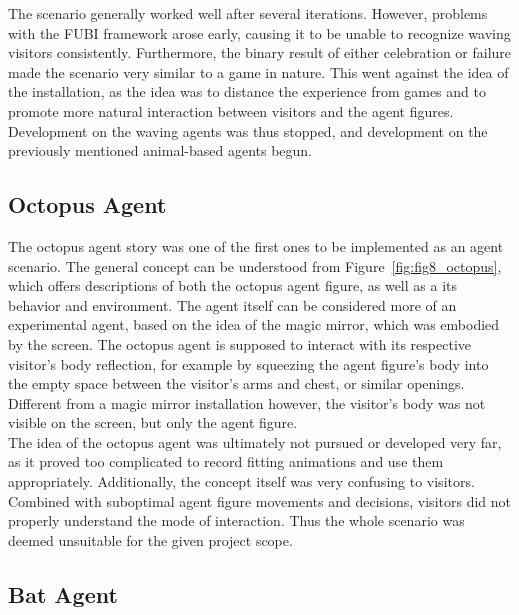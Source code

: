 \documentclass[draft,final]{vutinfth} %
\begin{document}
The scenario generally worked well after several iterations. 
However, problems with the FUBI framework arose early, causing it to be unable to recognize waving visitors consistently. 
Furthermore, the binary result of either celebration or failure made the scenario very similar to a game in nature. 
This went against the idea of the installation, as the idea was to distance the experience from games and to promote more natural interaction between visitors and the agent figures. 
Development on the waving agents was thus stopped, and development on the previously mentioned animal-based agents begun.

\subsection{Octopus Agent}
\label{chap:octopus}

The octopus agent story was one of the first ones to be implemented as an agent scenario. 
The general concept can be understood from Figure~\ref{fig:fig8_octopus}, which offers descriptions of both the octopus agent figure, as well as a its behavior and environment. 
The agent itself can be considered more of an experimental agent, based on the idea of the magic mirror, which was embodied by the screen. 
The octopus agent is supposed to interact with its respective visitor’s body reflection, for example by squeezing the agent figure’s body into the empty space between the visitor’s arms and chest, or similar openings.
Different from a magic mirror installation however, the visitor’s body was not visible on the screen, but only the agent figure. \\
The idea of the octopus agent was ultimately not pursued or developed very far, as it proved too complicated to record fitting animations and use them appropriately. 
Additionally, the concept itself was very confusing to visitors. 
Combined with suboptimal agent figure movements and decisions, visitors did not properly understand the mode of interaction. 
Thus the whole scenario was deemed unsuitable for the given project scope.

\subsection{Bat Agent}
\label{chap:bat}
\end{document}
